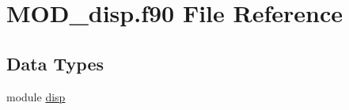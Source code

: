 \hypertarget{MOD__disp_8f90}{\section{M\-O\-D\-\_\-disp.\-f90 File Reference}
\label{MOD__disp_8f90}
}
\subsection*{Data Types}
\begin{DoxyCompactItemize}
\item 
module \hyperlink{classdisp}{disp}
\end{DoxyCompactItemize}

